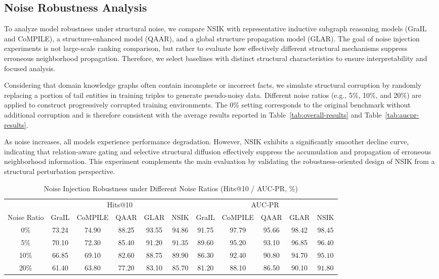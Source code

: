\documentclass[preprint,12pt]{elsarticle}
\begin{document}
\subsection{Noise Robustness Analysis}

To analyze model robustness under structural noise, we compare NSIK with representative inductive subgraph reasoning models (GraIL and CoMPILE), a structure-enhanced model (QAAR), and a global structure propagation model (GLAR). The goal of noise injection experiments is not large-scale ranking comparison, but rather to evaluate how effectively different structural mechanisms suppress erroneous neighborhood propagation. Therefore, we select baselines with distinct structural characteristics to ensure interpretability and focused analysis.

Considering that domain knowledge graphs often contain incomplete or incorrect facts, we simulate structural corruption by randomly replacing a portion of tail entities in training triples to generate pseudo-noisy data. Different noise ratios (e.g., 5\%, 10\%, and 20\%) are applied to construct progressively corrupted training environments. The 0\% setting corresponds to the original benchmark without additional corruption and is therefore consistent with the average results reported in Table~\ref{tab:overall-results} and Table~\ref{tab:aucpr-results}.

As noise increases, all models experience performance degradation. However, NSIK exhibits a significantly smoother decline curve, indicating that relation-aware gating and selective structural diffusion effectively suppress the accumulation and propagation of erroneous neighborhood information. This experiment complements the main evaluation by validating the robustness-oriented design of NSIK from a structural perturbation perspective.

\begin{table}[H]
\centering
\small
\caption{Noise Injection Robustness under Different Noise Ratios (Hits@10 / AUC-PR, \%)}
\label{tab:noise}
\begin{tabular}{c|ccccc|ccccc}
\hline
& \multicolumn{5}{c|}{Hits@10} & \multicolumn{5}{c}{AUC-PR} \\
Noise Ratio & GraIL & CoMPILE & QAAR & GLAR & NSIK & GraIL & CoMPILE & QAAR & GLAR & NSIK \\
\hline
0\%  & 73.24 & 74.90 & 88.25 & 93.55 & $\mathbf{94.86}$ & 91.75 & 97.79 & 95.66 & 98.42 & $\mathbf{98.45}$ \\
5\%  & 70.10 & 72.30 & 85.40 & 91.20 & $\mathbf{91.35}$ & 89.60 & 95.20 & 93.10 & 96.85 & $\mathbf{96.40}$ \\
10\% & 66.85 & 69.10 & 82.60 & 88.75 & $\mathbf{89.90}$ & 86.30 & 92.40 & 90.80 & 94.70 & $\mathbf{95.10}$ \\
20\% & 61.40 & 63.80 & 77.20 & 83.10 & $\mathbf{85.70}$ & 81.20 & 88.10 & 86.50 & 90.10 & $\mathbf{91.80}$ \\
\hline
\end{tabular}
\end{table}
\end{document}
